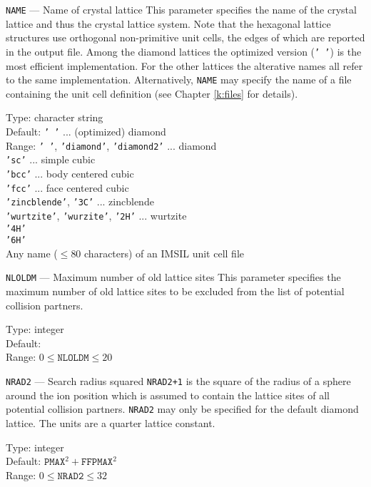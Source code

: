 \begin{keydescription}{\texttt{NAME} --- Name of crystal lattice}
%
This parameter specifies the name of the crystal lattice and thus the
crystal lattice system. Note that the hexagonal lattice structures use
orthogonal non-primitive unit cells, the edges of which are reported
in the output file. Among the diamond lattices the optimized version
(\texttt{' '}) is the most efficient implementation. For the other lattices the
alterative names all refer to the same implementation. Alternatively,
\texttt{NAME} may specify the name of a file containing the unit cell definition
(see Chapter \ref{k:files} for details).
\begin{keytab}
   Type:    \> character string \\
   Default: \> \texttt{' '} ... (optimized) diamond \\
   Range:   \> \texttt{' '}, \texttt{'diamond'}, \texttt{'diamond2'} ... diamond \\
            \> \texttt{'sc'} ... simple cubic \\
            \> \texttt{'bcc'} ... body centered cubic \\
            \> \texttt{'fcc'} ... face centered cubic \\
            \> \texttt{'zincblende'}, \texttt{'3C'} ... zincblende \\
            \> \texttt{'wurtzite'}, \texttt{'wurzite'}, \texttt{'2H'}
            ... wurtzite \\
            \> \texttt{'4H'} \\
            \> \texttt{'6H'} \\
            \> Any name ($\le 80$ characters) of an IMSIL unit cell file \\
\end{keytab}
\end{keydescription}

\begin{keydescription}{\texttt{NLOLDM} --- Maximum number of old lattice sites}
%
This parameter specifies the maximum number of old lattice sites to be 
excluded from the list of potential collision partners.
\begin{keytab}
   Type:    \> integer \\
   Default:  \\
   Range:   \> $0 \le \texttt{NLOLDM} \le 20$
\end{keytab}
\end{keydescription}

\begin{keydescription}{\texttt{NRAD2} --- Search radius squared}
%
\texttt{NRAD2+1} is the square of the radius of a sphere around the ion 
position which is assumed to contain the lattice sites of all potential 
collision partners. \texttt{NRAD2} may only be specified for the default
diamond lattice. The units are a quarter lattice constant.
\begin{keytab}
   Type:    \> integer \\
   Default: \> $\texttt{PMAX}^2 + \texttt{FFPMAX}^2$ \\
   Range:   \> $0 \le \texttt{NRAD2} \le 32$
\end{keytab}
\end{keydescription}

